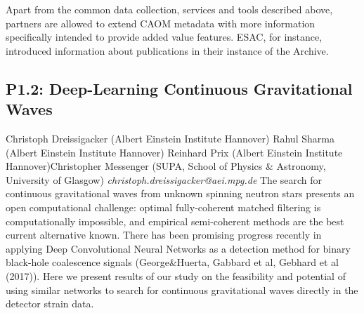 \documentclass{report}
\begin{document}
Apart from the common data collection, services and tools described above, partners are allowed to extend CAOM metadata with more information specifically intended to provide added value features. ESAC, for instance, introduced information about publications in their instance of the Archive.\newline
\newpage
\subsection*{P1.2: Deep-Learning Continuous Gravitational Waves}
\bigskip
Christoph Dreissigacker (Albert Einstein Institute Hannover) \newline Rahul Sharma (Albert Einstein Institute Hannover) \newline  Reinhard Prix (Albert Einstein Institute Hannover)\newline  Christopher Messenger (SUPA, School of Physics \& Astronomy, University of Glasgow)\newline  \newline  \newline\newline
{\it christoph.dreissigacker@aei.mpg.de}\newline
\newline\newline
The search for continuous gravitational waves from unknown
spinning neutron stars presents an open computational challenge: optimal
fully-coherent matched filtering is computationally impossible, and
empirical semi-coherent methods are the best current alternative known.
There has been promising progress recently in applying Deep
Convolutional Neural Networks as a detection method for binary
black-hole coalescence signals (George\&Huerta, Gabbard et al,
Gebhard et al (2017)).
Here we present results of our study on the feasibility and potential of
using similar networks to search for continuous gravitational waves
directly in the detector strain data.\newline
\newpage
\end{document}
